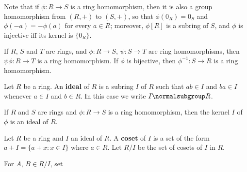  Note that if $\phi:R\to S$ is a ring
homomorphism, then it is also a group homomorphism from $(R,+)$ to
$(S,+)$, so that $\phi(0_R)=0_S$ and
$\phi(-a)=-\phi(a)$ for every $a\in R$;   moreover, $\phi[R]$ is a
subring of $S$, and $\phi$ is injective iff its kernel is $\{0_R\}$.

 If $R$, $S$ and $T$ are rings, and $\phi:R\to
S$, $\psi:S\to T$ are ring homomorphisms, then $\psi\phi:R\to T$ is a
ring homomorphism.   If $\phi$ is bijective, then $\phi^{-1}:S\to R$ is a
ring homomorphism.

 Let $R$ be a ring.   An {\bf ideal} of $R$ is
a subring $I$ of $R$ such that
$ab\in I$ and $ba\in I$ whenever $a\in I$ and $b\in R$.
In this case we write $I\normalsubgroup R$.


 If $R$ and $S$ are rings and $\phi:R\to S$ is a
ring homomorphism, then the kernel $I$ of $\phi$ is an ideal of $R$.

 Let $R$ be a ring and $I$ an ideal of
$R$.   A {\bf coset} of $I$ is a set of the form $a+I=\{a+x:x\in I\}$
where $a\in R$.      Let $R/I$ be the set of cosets of $I$ in $R$.

 For $A$, $B\in R/I$, set


